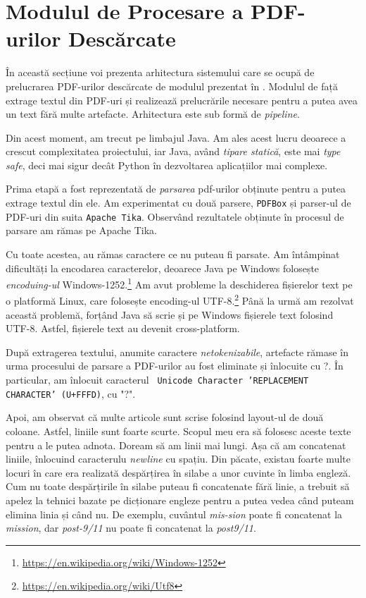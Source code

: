 \section{Modulul de Procesare a PDF-urilor Descărcate}
\label{section:pdf-parsing}

În această secțiune voi prezenta arhitectura sistemului care se ocupă de prelucrarea PDF-urilor descărcate de modulul prezentat în  . Modulul de față extrage textul din PDF-uri și realizează prelucrările necesare pentru a putea avea un text fără multe artefacte. Arhitectura este sub formă de \textit{pipeline}.

Din acest moment, am trecut pe limbajul Java. Am ales acest lucru deoarece a crescut complexitatea proiectului, iar Java, având \textit{tipare statică}, este mai \textit{type safe}, deci mai sigur decât Python în dezvoltarea aplicațiilor mai complexe.

Prima etapă a fost reprezentată de \textit{parsarea} pdf-urilor obținute pentru a putea extrage textul din ele. Am experimentat cu două parsere, \texttt{PDFBox} și parser-ul de PDF-uri din suita \texttt{Apache Tika}. Observând rezultatele obținute în procesul de parsare am rămas pe Apache Tika. 

Cu toate acestea, au rămas caractere ce nu puteau fi parsate. Am întâmpinat dificultăți la encodarea caracterelor, deoarece Java pe Windows folosește \textit{encoduing-ul} Windows-1252.\footnote{\url{https://en.wikipedia.org/wiki/Windows-1252}} Am avut probleme la deschiderea fișierelor text pe o platformă Linux, care folosește encoding-ul UTF-8.\footnote{\url{https://en.wikipedia.org/wiki/Utf8}} Până la urmă am rezolvat această problemă, forțând Java să scrie și pe Windows fișierele text folosind UTF-8. Astfel, fișierele text au devenit cross-platform.

După extragerea textului, anumite caractere \textit{netokenizabile}, artefacte rămase în urma procesului de parsare a PDF-urilor au fost eliminate și înlocuite cu ?. În particular, am înlocuit caracterul \texttt{
Unicode Character 'REPLACEMENT CHARACTER' (U+FFFD)}, cu "?".

Apoi, am observat că multe articole sunt scrise folosind layout-ul de două coloane. Astfel, liniile sunt foarte scurte. Scopul meu era să folosesc aceste texte pentru a le putea adnota. Doream să am linii mai lungi. Așa că am concatenat liniile, înlocuind caracterulu \textit{newline} cu spațiu. Din păcate, existau foarte multe locuri în care era realizată despărțirea în silabe a unor cuvinte în limba engleză. Cum nu toate despărțirile în silabe puteau fi concatenate fără linie, a trebuit să apelez la tehnici bazate pe dicționare engleze pentru a putea vedea când puteam elimina linia și când nu. De exemplu, cuvântul \textit{mis-sion} poate fi concatenat la \textit{mission}, dar \textit{post-9/11} nu poate fi concatenat la \textit{post9/11}.


